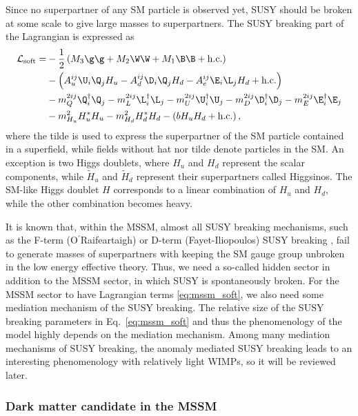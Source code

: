 \documentclass[12pt,twoside,book]{article}
\begin{document}
Since no superpartner of any SM particle is observed yet, SUSY should be broken at some scale to give large masses to superpartners.
The SUSY breaking part of the Lagrangian is expressed as
\begin{align}
  \mathcal{L}_{\mathrm{soft}} =&
  -\frac{1}{2} \left( M_3 \g \g + M_2 \W \W + M_1 \B \B + \mathrm{h.c.} \right) \notag \\&
  -\left( A_u^{ij} \U_i \Q_j H_u - A_d^{ij} \D_i \Q_j H_d - A_e^{ij} \E_i \L_j H_d + \mathrm{h.c.} \right) \notag \\&
  -m_Q^{2ij} \Q^\dagger_i \Q_j - m_L^{2ij} \L^\dagger_i \L_j - m_U^{2ij} \U^\dagger_i \U_j
  -m_D^{2ij} \D^\dagger_i \D_j - m_E^{2ij} \E^\dagger_i \E_j \notag \\&
  -m_{H_u}^2 H_u^{*} H_u - m_{H_d}^2 H_d^{*} H_d - \left( b H_u H_d + \mathrm{h.c.} \right),
  \label{eq:mssm_soft}
\end{align}
where the tilde is used to express the superpartner of the SM particle contained in a superfield, while fields without hat nor tilde denote particles in the SM.
An exception is two Higgs doublets, where $H_u$ and $H_d$ represent the scalar components, while $\tilde{H}_u$ and $\tilde{H}_d$ represent their superpartners called Higgsinos.
The SM-like Higgs doublet $H$ corresponds to a linear combination of $H_u$ and $H_d$, while the other combination becomes heavy.

It is known that, within the MSSM, almost all SUSY breaking mechanisms, such as the F-term (O$^{\mathrm{\prime}}$Raifeartaigh) \cite{ORaifeartaigh:1975nky} or D-term (Fayet-Iliopoulos) SUSY breaking \cite{Fayet:1974jb, Fayet:1974pd}, fail to generate masses of superpartners with keeping the SM gauge group unbroken in the low energy effective theory.
Thus, we need a so-called hidden sector in addition to the MSSM sector, in which SUSY is spontaneously broken.
For the MSSM sector to have Lagrangian terms \eqref{eq:mssm_soft}, we also need some mediation mechanism of the SUSY breaking.
The relative size of the SUSY breaking parameters in Eq.~\eqref{eq:mssm_soft} and thus the phenomenology of the model highly depends on the mediation mechanism.
Among many mediation mechanisms of SUSY breaking, the anomaly mediated SUSY breaking \cite{Giudice:1998xp, Randall:1998uk} leads to an interesting phenomenology with relatively light WIMPs, so it will be reviewed later.


\subsubsection*{Dark matter candidate in the MSSM}
\end{document}
